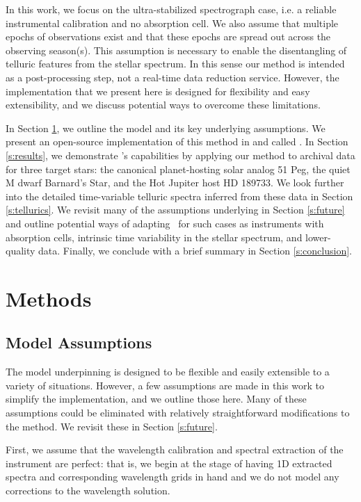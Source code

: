 \documentclass[twocolumn]{aastex62}
\newcommand{\Mdwarf}{Barnard's Star\xspace} %
\begin{document}
In this work, we focus on the ultra-stabilized spectrograph case, i.e. a reliable instrumental calibration and no absorption cell. 
We also assume that multiple epochs of observations exist and that these epochs are spread out across the observing season(s). 
This assumption is necessary to enable the disentangling of telluric features from the stellar spectrum. 
In this sense our method is intended as a post-processing step, not a real-time data reduction service. 
However, the implementation that we present here is designed for flexibility and easy extensibility, and we discuss potential ways to overcome these limitations.

In Section \ref{s:methods}, we outline the model and its key underlying assumptions. 
We present an open-source implementation of this method in \python and \TF called \wobble.
In Section \ref{s:results}, we demonstrate \wobble's capabilities by applying our method to \HARPS archival data for three target stars: the canonical planet-hosting solar analog 51 Peg, the quiet M dwarf \Mdwarf, and the Hot Jupiter host HD 189733. 
We look further into the detailed time-variable telluric spectra inferred from these data in Section \ref{s:tellurics}. 
We revisit many of the assumptions underlying \wobble in Section \ref{s:future} and outline potential ways of adapting \wobble\ for such cases as instruments with absorption cells, intrinsic time variability in the stellar spectrum, and lower-quality data. 
Finally, we conclude with a brief summary in Section \ref{s:conclusion}.

\section{Methods}
\label{s:methods}
\subsection{Model Assumptions}
\label{s:assumptions}

The model underpinning \wobble is designed to be flexible and easily extensible to a variety of situations. 
However, a few assumptions are made in this work to simplify the implementation, and we outline those here. 
Many of these assumptions could be eliminated with relatively straightforward modifications to the method. 
We revisit these in Section \ref{s:future}.

First, we assume that the wavelength calibration and spectral extraction of the instrument are perfect: that is, we begin at the stage of having 1D extracted spectra and corresponding wavelength grids in hand and we do not model any corrections to the wavelength solution. 
\end{document}
